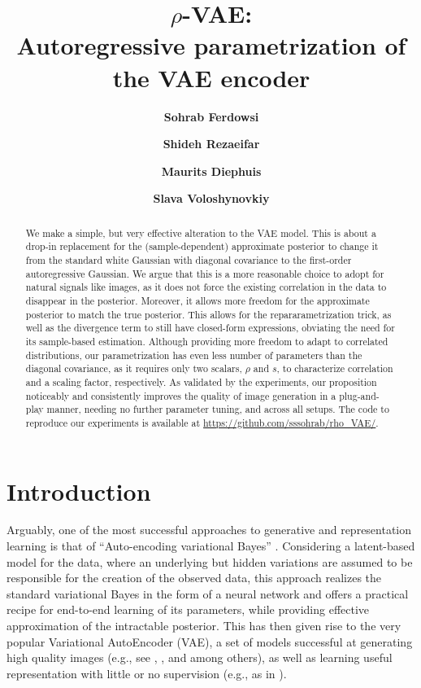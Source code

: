 \documentclass{article}
\title{$\rho$-VAE: \\Autoregressive parametrization of the VAE encoder}
\author{\textbf{Sohrab Ferdowsi}}
\author{\textbf{Shideh Rezaeifar}}
\author{\textbf{Maurits Diephuis}}
\author{\textbf{Slava Voloshynovkiy}}
\affil{
Department of Computer Science, University of Geneva, Switzerland \authorcr
  \{\tt sohrab.ferdowsi, shideh.rezaeifar, maurits.diephuis, svolos\}@unige.ch}
\begin{document}
\maketitle

\begin{abstract}


 
We make a simple, but very effective alteration to the VAE model. This is about a drop-in replacement for the (sample-dependent) approximate posterior to change it from the standard white Gaussian with diagonal covariance to the first-order autoregressive Gaussian. We argue that this is a more reasonable choice to adopt for natural signals like images, as it does not force the existing correlation in the data to disappear in the posterior. Moreover, it allows more freedom for the approximate posterior to match the true posterior. This allows for the repararametrization trick, as well as the divergence term to still have closed-form expressions, obviating the need for its sample-based estimation. Although providing more freedom to adapt to correlated distributions, our parametrization has even less number of parameters than the diagonal covariance, as it requires only two scalars, $\rho$ and $s$, to characterize correlation and a scaling factor, respectively. As validated by the experiments, our proposition noticeably and consistently improves the quality of image generation in a plug-and-play manner, needing no further parameter tuning, and across all setups. The code to reproduce our experiments is available at \url{https://github.com/sssohrab/rho_VAE/}.
 
\end{abstract}

\section{Introduction}
Arguably, one of the most successful approaches to generative and representation learning is that of ``Auto-encoding variational Bayes'' \cite{VAE}. Considering a latent-based model for the data, where an underlying but hidden variations are assumed to be responsible for the creation of the observed data, this approach realizes the standard variational Bayes in the form of a neural network and offers a practical recipe for end-to-end learning of its parameters, while providing effective approximation of the intractable posterior. This has then given rise to the very popular Variational AutoEncoder (VAE), a set of models successful at generating high quality images (e.g., see \cite{dai2019diagnosing}, \cite{rezende14} , \cite{LossyVAE} and \cite{PixelVAE} among others), as well as learning useful representation with little or no supervision (e.g., as in \cite{kingma2014semi}).
\end{document}
